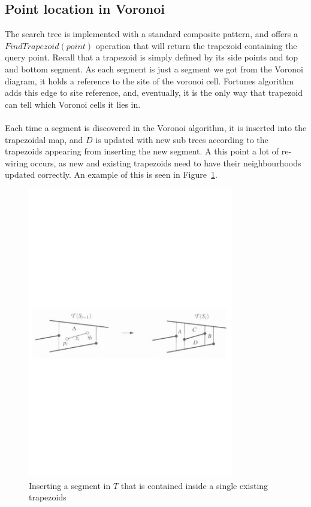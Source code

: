 \subsection{Point location in Voronoi}
The search tree is implemented with a standard composite pattern, and offers a $FindTrapezoid(point)$ operation that will return the trapezoid containing the query point.  Recall that a trapezoid is simply defined by its side points and top and bottom segment. As each segment is just a segment we got from the Voronoi diagram, it holds a reference to the site of the voronoi cell. Fortunes algorithm adds this edge to site reference, and, eventually, it is the only way that trapezoid can tell which Voronoi cells it lies in. 

\paragraph{}
Each time a segment is discovered in the Voronoi algorithm, it is inserted into the trapezoidal map, and $D$ is updated with new sub trees according to the trapezoids appearing from inserting the new segment. A this point a lot of re-wiring occurs, as new and existing trapezoids need to have their neighbourhoods updated correctly. An example of this is seen in Figure~\ref{fig:contained_segment}. 

\begin{figure}[]
    \centering
      \includegraphics[width=90mm]{images/contained_segment.pdf}
    \caption{Inserting a segment in $T$ that is contained inside a single existing trapezoids}
    \label{fig:contained_segment}
\end{figure}

